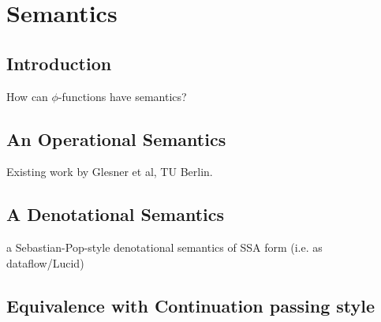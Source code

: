 \applynumberofpages\chapter{Semantics }


\section{Introduction}

How can $\phi$-functions have semantics?


\section{An Operational Semantics}

Existing work by Glesner et al, TU Berlin.


\section{A Denotational Semantics}

a Sebastian-Pop-style denotational semantics of SSA form (i.e. as
dataflow/Lucid)




\section{Equivalence with Continuation passing style}


